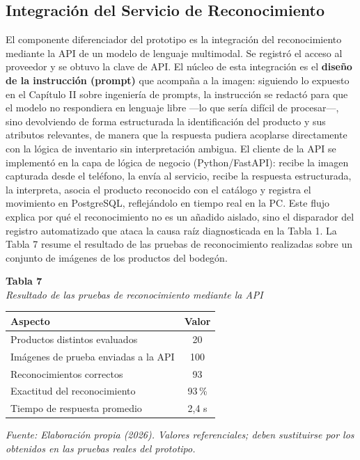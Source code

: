 \documentclass[12pt, letterpaper]{report}
\begin{document}
\subsection{Integración del Servicio de Reconocimiento}

El componente diferenciador del prototipo es la integración del
reconocimiento mediante la API de un modelo de lenguaje multimodal. Se
registró el acceso al proveedor y se obtuvo la clave de API. El núcleo
de esta integración es el \textbf{diseño de la instrucción (prompt)}
que acompaña a la imagen: siguiendo lo expuesto en el Capítulo II sobre
ingeniería de prompts, la instrucción se redactó para que el modelo no
respondiera en lenguaje libre ---lo que sería difícil de procesar---,
sino devolviendo de forma estructurada la identificación del producto
y sus atributos relevantes, de manera que la respuesta pudiera
acoplarse directamente con la lógica de inventario sin interpretación
ambigua. El cliente de la API se implementó en la capa de lógica de
negocio (Python/FastAPI): recibe la imagen capturada desde el teléfono,
la envía al servicio, recibe la respuesta estructurada, la interpreta,
asocia el producto reconocido con el catálogo y registra el movimiento
en PostgreSQL, reflejándolo en tiempo real en la PC. Este flujo explica
por qué el reconocimiento no es un añadido aislado, sino el disparador
del registro automatizado que ataca la causa raíz diagnosticada en la
Tabla 1. La Tabla 7 resume el resultado de las pruebas de
reconocimiento realizadas sobre un conjunto de imágenes de los
productos del bodegón.

\vspace{6pt}
%
\noindent\textbf{Tabla 7}\\
\textit{Resultado de las pruebas de reconocimiento mediante la API}
\vspace{4pt}

\begin{center}
\begin{tabular}{|>{\raggedright\arraybackslash}p{7.0cm}|c|}
\hline
\textbf{Aspecto} & \textbf{Valor} \\
\hline
Productos distintos evaluados & 20 \\
\hline
Imágenes de prueba enviadas a la API & 100 \\
\hline
Reconocimientos correctos & 93 \\
\hline
Exactitud del reconocimiento & 93\,\% \\
\hline
Tiempo de respuesta promedio & 2,4 s \\
\hline
\end{tabular}
\end{center}
\vspace{2pt}
\noindent\small\textit{Fuente: Elaboración propia (2026). Valores
referenciales; deben sustituirse por los obtenidos en las pruebas
reales del prototipo.}\normalsize
{}
\end{document}
